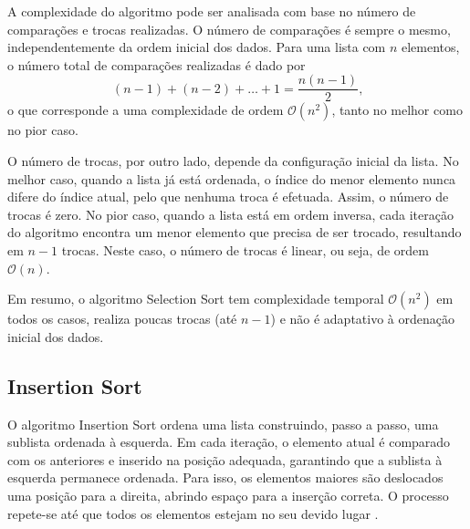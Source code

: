 \documentclass[conference]{IEEEtran}
\begin{document}
A complexidade do algoritmo pode ser analisada com base no número de comparações e trocas realizadas. O número de comparações é sempre o mesmo, independentemente da ordem inicial dos dados. Para uma lista com \( n \) elementos, o número total de comparações realizadas é dado por
$$
(n-1) + (n-2) + \ldots + 1 = \frac{n(n-1)}{2} \text{,}
$$
o que corresponde a uma complexidade de ordem \(\mathcal{O}(n^2)\), tanto no melhor como no pior caso.

O número de trocas, por outro lado, depende da configuração inicial da lista. No melhor caso, quando a lista já está ordenada, o índice do menor elemento nunca difere do índice atual, pelo que nenhuma troca é efetuada. Assim, o número de trocas é zero. No pior caso, quando a lista está em ordem inversa, cada iteração do algoritmo encontra um menor elemento que precisa de ser trocado, resultando em \(n - 1\) trocas. Neste caso, o número de trocas é linear, ou seja, de ordem \(\mathcal{O}(n)\).

Em resumo, o algoritmo Selection Sort tem complexidade temporal \(\mathcal{O}(n^2)\) em todos os casos, realiza poucas trocas (até \(n-1\)) e não é adaptativo à ordenação inicial dos dados.


\subsection{Insertion Sort}

O algoritmo Insertion Sort ordena uma lista construindo, passo a passo, uma sublista ordenada à esquerda. Em cada iteração, o elemento atual é comparado com os anteriores e inserido na posição adequada, garantindo que a sublista à esquerda permanece ordenada. Para isso, os elementos maiores são deslocados uma posição para a direita, abrindo espaço para a inserção correta. O processo repete-se até que todos os elementos estejam no seu devido lugar \cite{samee2015analysis}.
\end{document}
